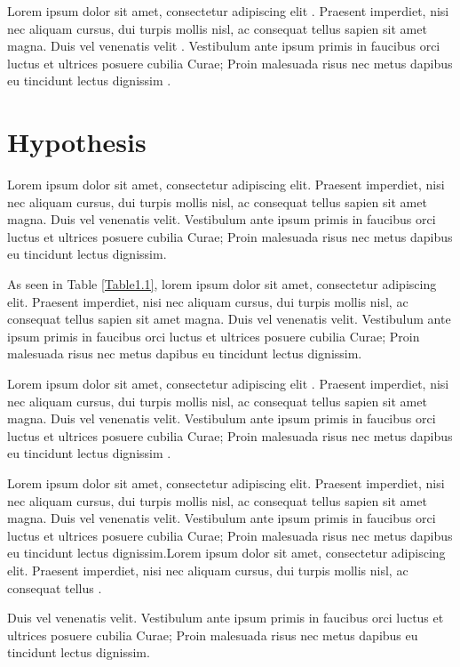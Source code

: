 Lorem ipsum dolor sit amet, consectetur adipiscing elit \cite{HYP:HYP57}. Praesent imperdiet, nisi nec aliquam cursus, dui turpis mollis nisl, ac consequat tellus sapien sit amet magna. Duis vel venenatis velit \cite{Box:1990:TSA:574978}. Vestibulum ante ipsum primis in faucibus orci luctus et ultrices posuere cubilia Curae; Proin malesuada risus nec metus dapibus eu tincidunt lectus dignissim \cite{17590413}. 

\section{Hypothesis}

Lorem ipsum dolor sit amet, consectetur adipiscing elit. Praesent imperdiet, nisi nec aliquam cursus, dui turpis mollis nisl, ac consequat tellus sapien sit amet magna. Duis vel venenatis velit. Vestibulum ante ipsum primis in faucibus orci luctus et ultrices posuere cubilia Curae; Proin malesuada risus nec metus dapibus eu tincidunt lectus dignissim. 

As seen in Table \ref{Table1.1}, lorem ipsum dolor sit amet, consectetur adipiscing elit. Praesent imperdiet, nisi nec aliquam cursus, dui turpis mollis nisl, ac consequat tellus sapien sit amet magna. Duis vel venenatis velit. Vestibulum ante ipsum primis in faucibus orci luctus et ultrices posuere cubilia Curae; Proin malesuada risus nec metus dapibus eu tincidunt lectus dignissim. 

Lorem ipsum dolor sit amet, consectetur adipiscing elit \cite{harper2007}. Praesent imperdiet, nisi nec aliquam cursus, dui turpis mollis nisl, ac consequat tellus sapien sit amet magna. Duis vel venenatis velit. Vestibulum ante ipsum primis in faucibus orci luctus et ultrices posuere cubilia Curae; Proin malesuada risus nec metus dapibus eu tincidunt lectus dignissim \cite{unesco}.

Lorem ipsum dolor sit amet, consectetur adipiscing elit. Praesent imperdiet, nisi nec aliquam cursus, dui turpis mollis nisl, ac consequat tellus sapien sit amet magna. Duis vel venenatis velit. Vestibulum ante ipsum primis in faucibus orci 
luctus et ultrices posuere cubilia Curae; Proin malesuada risus nec metus dapibus eu tincidunt lectus dignissim.Lorem ipsum dolor sit amet, consectetur adipiscing elit. Praesent imperdiet, nisi nec aliquam cursus, dui turpis mollis nisl, ac consequat tellus \cite{mccaffrey88,moore91,nelson88,sisaky,simpsondvd,startrek,TS-40561,url-1,url-2,vanden2001}.

Duis vel venenatis velit. Vestibulum ante ipsum primis in faucibus orci luctus et ultrices posuere cubilia Curae; Proin malesuada risus nec metus dapibus eu tincidunt lectus dignissim.

